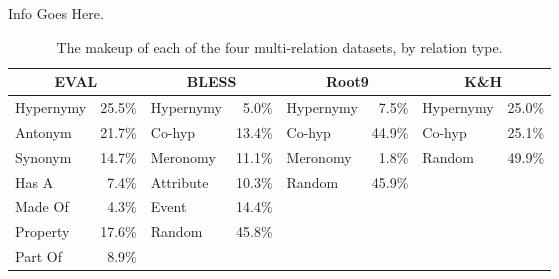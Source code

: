 Info Goes Here.

\begin{table}
\centering
\begin{footnotesize}
\begin{tabular}{|lr|lr|lr|lr|}
  \hline
  \multicolumn{2}{|c|}{{\bf EVAL}} & \multicolumn{2}{c|}{{\bf BLESS}} & \multicolumn{2}{c|}{{\bf Root9}} & \multicolumn{2}{c|}{{\bf K\&H}}\\
  \hline
  \hline
  Hypernymy & 25.5\% & Hypernymy   &  5.0\% & Hypernymy   &  7.5\% & Hypernymy   & 25.0\% \\
  Antonym   & 21.7\% & Co-hyp      & 13.4\% & Co-hyp      & 44.9\% & Co-hyp      & 25.1\% \\
  Synonym   & 14.7\% & Meronomy    & 11.1\% & Meronomy    &  1.8\% & Random      & 49.9\% \\
  Has A     &  7.4\% & Attribute   & 10.3\% & Random      & 45.9\% &             &        \\
  Made Of   &  4.3\% & Event       & 14.4\% &             &        &             &        \\
  Property  & 17.6\% & Random      & 45.8\% &             &        &             &        \\
  Part Of   &  8.9\% &             &        &             &        &             &        \\
  \hline
\end{tabular}
\end{footnotesize}
\caption{The makeup of each of the four multi-relation datasets, by relation
type.}
\end{table}


